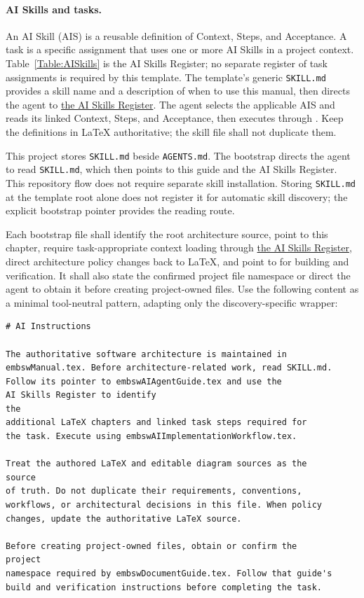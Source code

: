 \paragraph{AI Skills and tasks.}
An AI Skill (AIS) is a reusable definition of Context, Steps, and Acceptance.
A task is a specific assignment that uses one or more AI Skills in a project
context. Table~\ref{Table:AISkills} is the AI Skills Register; no separate
register of task assignments is required by this template.
The template's generic \texttt{SKILL.md} provides a skill name and a description
of when to use this manual, then directs the agent to
\hyperref[Table:AISkills]{the AI Skills Register}. The agent selects the
applicable AIS and reads its linked Context, Steps, and Acceptance, then
executes through . Keep the definitions
in LaTeX authoritative; the skill file shall not duplicate them.

This project stores \texttt{SKILL.md} beside \texttt{AGENTS.md}. The bootstrap directs the agent to read
\texttt{SKILL.md}, which then points to this guide and the AI Skills Register.
This repository flow does not require separate skill installation. Storing
\texttt{SKILL.md} at the template root alone does not register it for automatic
skill discovery; the explicit bootstrap pointer provides the reading route.

Each bootstrap file shall identify the root architecture source, point to this
chapter, require task-appropriate context loading through
\hyperref[Table:AISkills]{the AI Skills Register}, direct architecture
policy changes back to LaTeX, and point to  for
building and verification. It shall also state the confirmed project file
namespace or direct the agent to obtain it before creating project-owned files.
Use the following content as a minimal tool-neutral pattern, adapting only the
discovery-specific wrapper:

\begin{verbatim}
# AI Instructions

The authoritative software architecture is maintained in
embswManual.tex. Before architecture-related work, read SKILL.md.
Follow its pointer to embswAIAgentGuide.tex and use the
AI Skills Register to identify
the
additional LaTeX chapters and linked task steps required for
the task. Execute using embswAIImplementationWorkflow.tex.

Treat the authored LaTeX and editable diagram sources as the
source
of truth. Do not duplicate their requirements, conventions,
workflows, or architectural decisions in this file. When policy
changes, update the authoritative LaTeX source.

Before creating project-owned files, obtain or confirm the
project
namespace required by embswDocumentGuide.tex. Follow that guide's
build and verification instructions before completing the task.
\end{verbatim}


